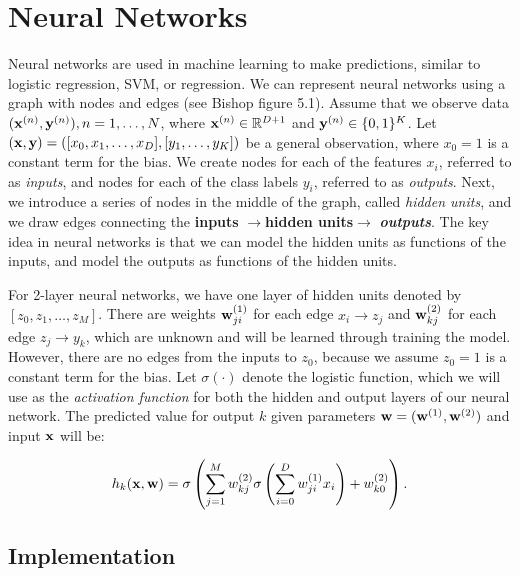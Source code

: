 
\section{Neural Networks}\label{sec:neural_networks}

Neural networks are used in machine learning to make predictions, similar to logistic regression, SVM, or regression.  We can represent neural networks using a graph with nodes and edges (see Bishop figure 5.1).  Assume that we observe data $(\boldsymbol{\mathbf{x}}^{(n)},\boldsymbol{\mathbf{y}}^{(n)}), n = 1, \ldots, N$,  where $\boldsymbol{\mathbf{x}}^{(n)} \in \mathbb{R}^{D+1}$ and $\boldsymbol{\mathbf{y}}^{(n)} \in \{0,1\}^K$.  Let $(\boldsymbol{\mathbf{x}},\boldsymbol{\mathbf{y}}) = ([x_0, x_1, \ldots, x_D],[y_1, \ldots, y_K])$ be a general observation, where $x_0 = 1$ is a constant term for the bias.  We create nodes for each of the features $x_i$, referred to as \emph{inputs}, and nodes for each of the class labels $y_i$, referred to as \emph{outputs}.  Next, we introduce a series of nodes in the middle of the graph, called \emph{hidden units}, and we draw edges connecting the {\bf inputs} $\rightarrow ${\bf hidden units}$ \rightarrow$ \emph{\bf outputs}.  The key idea in neural networks is that we can model the hidden units as functions of the inputs, and model the outputs as functions of the hidden units.   

For 2-layer neural networks, we have one layer of hidden units denoted by $[z_0, z_1,\ldots, z_M]$.   There are weights $\boldsymbol{\mathbf{w}}^{(1)}_{ji}$ for each edge $x_i \rightarrow z_j$ and $\boldsymbol{\mathbf{w}}^{(2)}_{kj}$ for each edge $z_j \rightarrow y_k$, which are unknown and will be learned through training the model.  However, there are no edges from the inputs to $z_0$, because we assume $z_0 = 1$ is a constant term for the bias.  Let $\sigma(\cdot)$ denote the logistic function, which we will use as the \emph{activation function} for both the hidden and output layers of our neural network.  The predicted value for output $k$ given parameters $\boldsymbol{\mathbf{w}} = (\boldsymbol{\mathbf{w}}^{(1)}, \boldsymbol{\mathbf{w}}^{(2)})$ and input $\boldsymbol{\mathbf{x}}$ will be:

\begin{equation}
h_{k}(\boldsymbol{\mathbf{x}},\boldsymbol{\mathbf{w}}) = \sigma\left(\sum_{j=1}^{M} w^{(2)}_{kj} \sigma\left(\sum_{i=0}^{D} w^{(1)}_{ji} x_i\right)  + w_{k0}^{(2)} \right).
\end{equation}

\subsection{Implementation}

